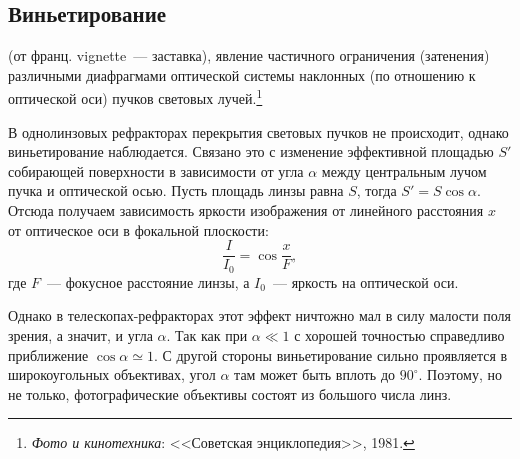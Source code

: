 \subsection{Виньетирование}
 (от франц. vignette~--- заставка), явление частичного ограничения (затенения) различными диафрагмами оптической системы наклонных (по отношению к оптической оси) пучков световых лучей.\footnote{{\itshape Фото и кинотехника}: <<Советская энциклопедия>>, 1981.}

В однолинзовых рефракторах перекрытия световых пучков не происходит, однако виньетирование наблюдается. Связано это с изменение эффективной площадью $S'$ собирающей поверхности в зависимости от угла $\alpha$ между центральным лучом пучка и оптической осью. Пусть площадь линзы равна $S$, тогда $S' = S\cos \alpha$. Отсюда получаем зависимость яркости изображения от линейного расстояния $x$ от оптическое оси в фокальной плоскости:
\begin{equation*}
    \frac{I}{I_0} = \cos \frac{x}{F},
\end{equation*}
где $F$~---  фокусное расстояние линзы, а $I_0$~--- яркость на оптической оси.

Однако в телескопах-рефракторах этот эффект ничтожно мал в силу малости поля зрения, а значит, и угла $\alpha$. Так как при $\alpha \ll 1$ с хорошей точностью справедливо приближение $\cos \alpha \simeq 1$. С другой стороны виньетирование сильно проявляется в широкоугольных объективах, угол $\alpha$ там может быть вплоть до $90^\circ$. Поэтому, но не только, фотографические объективы состоят из большого числа линз.

